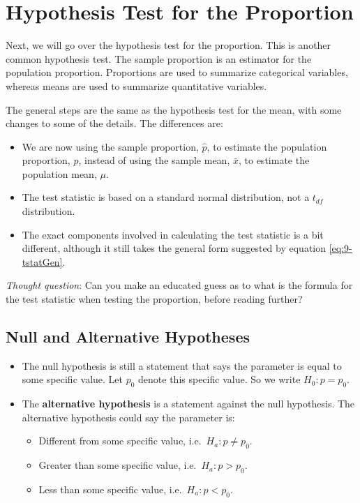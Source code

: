 \documentclass[
]{book}
\begin{document}
\hypertarget{testprop}{%
\section{Hypothesis Test for the Proportion}\label{testprop}}

Next, we will go over the hypothesis test for the proportion. This is another common hypothesis test. The sample proportion is an estimator for the population proportion. Proportions are used to summarize categorical variables, whereas means are used to summarize quantitative variables.

The general steps are the same as the hypothesis test for the mean, with some changes to some of the details. The differences are:

\begin{itemize}
\item
  We are now using the sample proportion, \(\hat{p}\), to estimate the population proportion, \(p\), instead of using the sample mean, \(\bar{x}\), to estimate the population mean, \(\mu\).
\item
  The test statistic is based on a standard normal distribution, not a \(t_{df}\) distribution.
\item
  The exact components involved in calculating the test statistic is a bit different, although it still takes the general form suggested by equation \eqref{eq:9-tstatGen}.
\end{itemize}

\emph{Thought question}: Can you make an educated guess as to what is the formula for the test statistic when testing the proportion, before reading further?

\hypertarget{null-and-alternative-hypotheses-1}{%
\subsection{Null and Alternative Hypotheses}\label{null-and-alternative-hypotheses-1}}

\begin{itemize}
\item
  The null hypothesis is still a statement that says the parameter is equal to some specific value. Let \(p_0\) denote this specific value. So we write \(H_0: p = p_0\).
\item
  The \textbf{alternative hypothesis} is a statement against the null hypothesis. The alternative hypothesis could say the parameter is:

  \begin{itemize}
  \item
    Different from some specific value, i.e.~\(H_a: p \neq p_0\).
  \item
    Greater than some specific value, i.e.~\(H_a: p > p_0\).
  \item
    Less than some specific value, i.e.~\(H_a: p < p_0\).
  \end{itemize}
\end{itemize}
\end{document}

